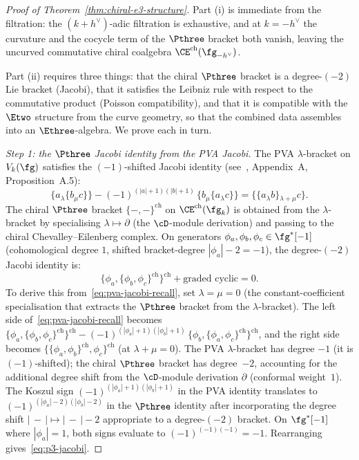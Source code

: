 \begin{proof}[Proof of Theorem~\ref{thm:chiral-e3-structure}]
Part (i) is immediate from the filtration: the $(k+h^\vee)$-adic
filtration is exhaustive, and at $k = -h^\vee$ the curvature
and the cocycle term of the $\Pthree$ bracket both vanish,
leaving the uncurved commutative chiral coalgebra
$\CE^{\mathrm{ch}}(\fg_{-h^\vee})$.

Part (ii) requires three things: that the chiral
$\Pthree$ bracket is a degree-$(-2)$ Lie bracket
(Jacobi), that it satisfies the Leibniz rule with respect
to the commutative product (Poisson compatibility), and
that it is compatible with the $\Etwo$ structure from
the curve geometry, so that the combined data assembles
into an $\Ethree$-algebra. We prove each in turn.

\textit{Step 1: the $\Pthree$ Jacobi identity from the
PVA Jacobi.}
The PVA $\lambda$-bracket on $V_k(\fg)$ satisfies the
$(-1)$-shifted Jacobi identity
(see~\cite{Lorgat26II}, Appendix~A, Proposition~A.5):
\begin{equation}\label{eq:pva-jacobi-recall}
  \{a \mathbin{{}_\lambda} \{b \mathbin{{}_\mu} c\}\}
  - (-1)^{(|a|+1)(|b|+1)}\,
  \{b \mathbin{{}_\mu} \{a \mathbin{{}_\lambda} c\}\}
  = \{\{a \mathbin{{}_\lambda} b\}
  \mathbin{{}_{{\lambda+\mu}}} c\}.
\end{equation}
The chiral $\Pthree$ bracket
$\{-,-\}^{\mathrm{ch}}$
on $\CE^{\mathrm{ch}}(\fg_k)$ is obtained from the
$\lambda$-bracket by specialising $\lambda \mapsto \partial$
(the $\cD$-module derivation) and passing to the chiral
Chevalley--Eilenberg complex. On generators
$\phi_a, \phi_b, \phi_c \in \fg^*[-1]$
(cohomological degree $1$, shifted bracket-degree
$|\phi_a| - 2 = -1$), the degree-$(-2)$ Jacobi identity
is:
\begin{equation}\label{eq:p3-jacobi}
  \{\phi_a, \{\phi_b, \phi_c\}^{\mathrm{ch}}\}^{\mathrm{ch}}
  + \text{graded cyclic}
  = 0.
\end{equation}
To derive this from~\eqref{eq:pva-jacobi-recall}, set
$\lambda = \mu = 0$ (the constant-coefficient specialisation
that extracts the $\Pthree$ bracket from the
$\lambda$-bracket). The left side
of~\eqref{eq:pva-jacobi-recall} becomes
$\{\phi_a, \{\phi_b, \phi_c\}^{\mathrm{ch}}\}^{\mathrm{ch}}
- (-1)^{(|\phi_a|+1)(|\phi_b|+1)}\,
\{\phi_b, \{\phi_a, \phi_c\}^{\mathrm{ch}}\}^{\mathrm{ch}}$,
and the right side becomes
$\{\{\phi_a, \phi_b\}^{\mathrm{ch}},
\phi_c\}^{\mathrm{ch}}$ (at $\lambda + \mu = 0$).
The PVA $\lambda$-bracket has degree $-1$ (it is
$(-1)$-shifted); the chiral $\Pthree$ bracket has
degree~$-2$, accounting for the additional degree shift
from the $\cD$-module derivation $\partial$ (conformal
weight~$1$). The Koszul sign
$(-1)^{(|\phi_a|+1)(|\phi_b|+1)}$ in the PVA identity
translates to $(-1)^{(|\phi_a|-2)(|\phi_b|-2)}$ in the
$\Pthree$ identity after incorporating the degree shift
$|\,{-}\,| \mapsto |\,{-}\,| - 2$ appropriate to a
degree-$(-2)$ bracket. On $\fg^*[-1]$ where
$|\phi_a| = 1$, both signs evaluate to
$(-1)^{(-1)(-1)} = -1$. Rearranging
gives~\eqref{eq:p3-jacobi}.


\end{proof}
